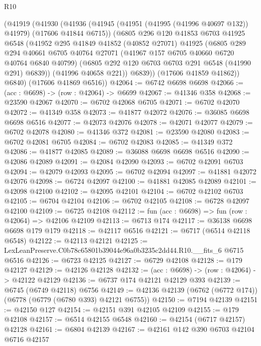 \begin{lexlean}{R10}
\begin{coremodule}
      (@41919
        (@41930
          (@41936
            (@41945 (@41951 (@41995 (@41996 @40697 @132)) @41979) (@17606 @41844 @6715))
            (@6805
              @296
              @120
              @41853
              @6703
              @41925
              @6548
              (@41952
                @295
                @41849
                @41852
                (@40852 @27071)
                @41925
                (@6805
                  @289
                  @294
                  @40661
                  @6705
                  @40764
                  @27071
                  (@41967 @157 @6705 @40660 @6720 @40764 @6840 @40799)
                  (@6805 @292 @120 @6703 @6703 @291 @6548 (@41990 @291) @6839))
                (@41996 @40658 @221))
              @6839))
          (@17606 @41859 @41862))
        @6840)
      (@17606 @41869 @6516))
@42064 := @6742 @6698 @6698
@42066 := (acc : @6698) -> (row : @42064) -> @6699
@42067 := @41346 @358
@42068 := @23590 @42067
@42070 := @6702 @42068 @6705
@42071 := @6702 @42070
@42072 := @41349 @358
@42073 := @41877 @42072
@42076 := @36085 @6698 @6698 @6516
@42077 := @42073 @42076
@42078 := @42071 @42077
@42079 := @6702 @42078
@42080 := @41346 @372
@42081 := @23590 @42080
@42083 := @6702 @42081 @6705
@42084 := @6702 @42083
@42085 := @41349 @372
@42086 := @41877 @42085
@42089 := @36088 @6698 @6698 @6516
@42090 := @42086 @42089
@42091 := @42084 @42090
@42093 := @6702 @42091 @6703
@42094 := @42079 @42093
@42095 := @6702 @42094
@42097 := @41881 @42072 @42076
@42098 := @6724 @42097
@42100 := @41881 @42085 @42089
@42101 := @42098 @42100
@42102 := @42095 @42101
@42104 := @6702 @42102 @6703
@42105 := @6704 @42104
@42106 := @6702 @42105
@42108 := @6728 @42097 @42100
@42109 := @6725 @42108
@42112 := fun (acc : @6698) => fun (row : @42064) => @42106 @42109
@42113 := @6713 @174
@42117 := @36138 @6698 @6698 @179 @179
@42118 := @42117 @6516
@42121 := @6717 (@6514 @42118 @6548)
@42122 := @42113 @42121
@42125 := LexLeanPreserve.C0b78c65801b39044e96a0b3235c2dd44.R10.__fits_6 @6715 @6516
@42126 := @6723 @42125
@42127 := @6729 @42108
@42128 := @179 @42127
@42129 := @42126 @42128
@42132 := (acc : @6698) -> (row : @42064) -> @42122 @42129
@42136 := @6737 @174 @42121 @42129 @393
@42139 := @6745 (@6749 @42118) @6756
@42149 := @42136 @42139 (@6762 (@6772 @174)) (@6778 (@6779 (@6780 @393) @42121 @6755))
@42150 := @7194 @42139
@42151 := @42150 @127
@42154 := @42151 @391 @42105 @42109
@42155 := @179 @42108
@42157 := @6514 @42155 @6548
@42160 := @42154 (@6717 @42157) @42128
@42161 := @6804 @42139
@42167 := @42161 @142 @390 @6703 @42104 @6716 @42157

\end{coremodule}
\end{lexlean}

